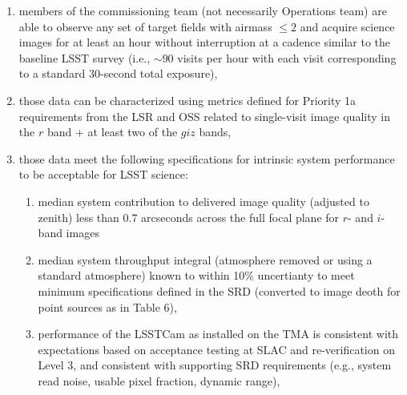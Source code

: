 \documentclass[SE,authoryear,toc,lsstdraft]{lsstdoc}
\begin{document}
\begin{enumerate}
  \item members of the commissioning team (not necessarily Operations team) are able to observe any set of target fields with airmass $\leq 2$ and acquire science images for at least an hour without interruption at a cadence similar to the baseline LSST survey (i.e., $\sim90$ visits per hour with each visit corresponding to a standard 30-second total exposure),
  \item those data can be characterized using metrics defined for Priority 1a requirements from the LSR  and OSS  related to single-visit image quality in the $r$ band + at least two of the $giz$ bands,
  \item those data meet the following specifications for intrinsic system performance to be acceptable for LSST science:
  \begin{enumerate}
    \item median system contribution to delivered image quality (adjusted to zenith) less than 0.7 arcseconds across the full focal plane for $r$- and $i$-band images
    \item median system throughput integral (atmosphere removed or using a standard atmosphere) known to within 10\% uncertianty to meet minimum specifications defined in the SRD (converted to image deoth for point sources as in Table 6),
    \item performance of the LSSTCam as installed on the TMA is consistent with expectations based on acceptance testing at SLAC and re-verification on Level 3, and consistent with supporting SRD requirements (e.g., system read noise, usable pixel fraction, dynamic range),

\end{enumerate}
\end{enumerate}
\end{document}
